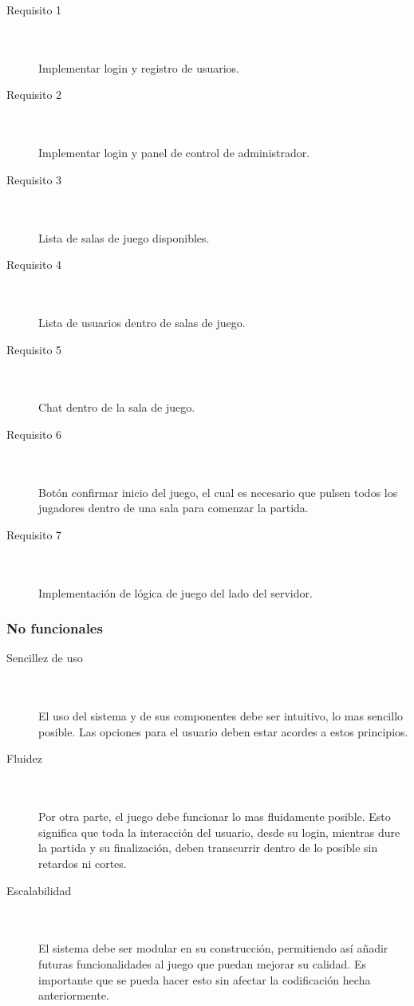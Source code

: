 \documentclass[a4paper,11pt]{article}
\begin{document}
\begin{description}
	\item[Requisito 1] \hfill \\ \\
	Implementar login y registro de usuarios.
	\item[Requisito 2] \hfill \\ \\
	Implementar login y panel de control de administrador.
	\item[Requisito 3] \hfill \\ \\
	Lista de salas de juego disponibles.
	\item[Requisito 4] \hfill \\ \\
	Lista de usuarios dentro de salas de juego.
	\item[Requisito 5] \hfill \\ \\
	Chat dentro de la sala de juego.
	\item[Requisito 6] \hfill \\ \\
	Botón confirmar inicio del juego, el cual es necesario que pulsen
	todos los jugadores dentro de una sala para comenzar la partida.
	\item[Requisito 7] \hfill \\ \\
	Implementación de lógica de juego del lado del servidor.
\end{description}

\subsubsection{No funcionales}

\begin{description}
	\item[Sencillez de uso] \hfill \\ \\
	El uso del sistema y de sus componentes debe ser intuitivo, lo mas 
	sencillo posible. Las opciones para el usuario deben estar acordes
	a estos principios. 
	\item[Fluidez] \hfill \\ \\
	Por otra parte, el juego debe funcionar lo mas fluidamente posible.
	Esto significa que toda la interacción del usuario, desde su login, 
	mientras dure la partida y su finalización, deben transcurrir dentro 
	de lo posible sin retardos ni cortes.
	\item[Escalabilidad] \hfill \\ \\
	El sistema debe ser modular en su construcción, permitiendo así 
	añadir futuras funcionalidades al juego que puedan mejorar su
	calidad. Es importante que se pueda hacer esto sin afectar la 
	codificación hecha anteriormente.

\end{description}
\newpage
\end{document}

